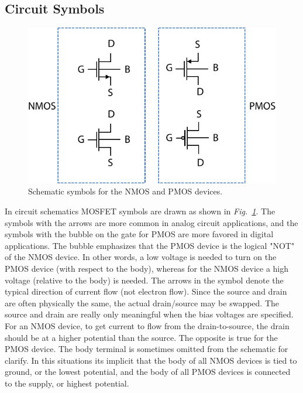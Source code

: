 \subsection{Circuit Symbols}
\begin{figure}[tb]
\centering
\includegraphics[width=.6\columnwidth]{mos_symbols}
\caption{Schematic symbols for the NMOS and PMOS devices.}
\label{fig:mos_symbols}
\end{figure}
In circuit schematics MOSFET symbols are drawn as shown in \emph{Fig.~\ref{fig:mos_symbols}}.  The symbols with the arrows are more common in analog circuit applications, and the symbols with the bubble on the gate for PMOS are more favored in digital applications.  The bubble emphasizes that the PMOS device is the logical "NOT" of the NMOS device. In other words, a low voltage is needed to turn on the PMOS device (with respect to the body), whereas for the NMOS device a high voltage (relative to the body) is needed.  The arrows in the symbol denote the typical direction of current flow (not electron flow).  Since the source and drain are often physically the same, the actual drain/source may be swapped.  The source and drain are really only meaningful when the bias voltages are specified. For an NMOS device, to get current to flow from the drain-to-source, the drain should be at a higher potential than the source.  The opposite is true for the PMOS device.
The body terminal is sometimes omitted from the schematic for clarify.  In this situations its implicit that the body of all NMOS devices is tied to ground, or the lowest potential, and the body of all PMOS devices is connected to the supply, or highest potential.
